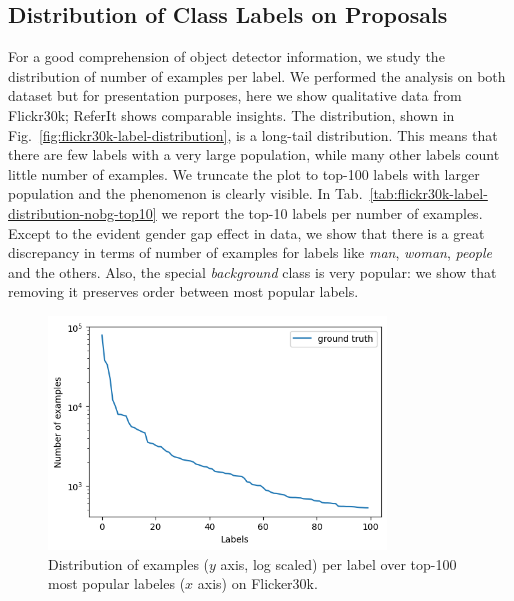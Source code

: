 \subsection{Distribution of Class Labels on Proposals}

For a good comprehension of object detector information, we study the
distribution of number of examples per label. We performed the analysis
on both dataset but for presentation purposes, here we show
qualitative data from Flickr30k; ReferIt shows comparable insights.
The distribution, shown in
Fig.~\ref{fig:flickr30k-label-distribution}, is a long-tail
distribution. This means that there are few labels with a very large
population, while many other labels count little number of examples.
We truncate the plot to top-100 labels with larger population and the
phenomenon is clearly visible. In
Tab.~\ref{tab:flickr30k-label-distribution-nobg-top10} we report the
top-10 labels per number of examples. Except to the evident gender gap
effect in data, we show that there is a great discrepancy in terms of
number of examples for labels like \textit{man}, \textit{woman},
\textit{people} and the others. Also, the special \textit{background}
class is very popular: we show that removing it preserves order
between most popular labels.

\begin{figure}
  \includegraphics[width=0.8\textwidth]{figures/number-of-examples-per-label-over-top-100-most-popular-labels.png}
  \caption[Number of examples per label over top-100 most popular labels on Flicker30k]{Distribution of examples ($y$ axis, log scaled) per label over top-100 most popular labeles ($x$ axis) on Flicker30k.}
  \label{tab:flickr30k-label-distribution-top10}
\end{figure}

